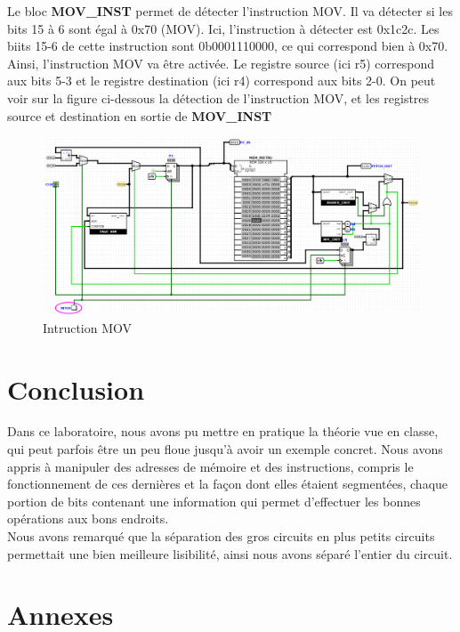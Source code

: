 \documentclass[a4paper]{article} %
\begin{document}
Le bloc \textbf{MOV\_INST} permet de détecter l'instruction MOV. Il va détecter si les bits 15 à 6 sont égal à 0x70 (MOV). Ici, l'instruction à détecter est 0x1c2c. Les biits 15-6 de cette instruction sont 0b0001110000, ce qui correspond bien à 0x70. Ainsi, l'instruction MOV va être activée. Le registre source (ici r5) correspond aux bits 5-3 et le registre destination (ici r4) correspond aux bits 2-0. On peut voir sur la figure ci-dessous la détection de l'instruction MOV, et les registres source et destination en sortie de \textbf{MOV\_INST}

\begin{figure}[H]
    \centering
    \includegraphics[width=1\textwidth]{src/FETCH_INTER_1c2c.png}
    \caption{Intruction MOV}
    \label{fetch_inter}
\end{figure}

\section{Conclusion}
Dans ce laboratoire, nous avons pu mettre en pratique la théorie vue en classe, qui peut parfois être un peu floue jusqu'à avoir un exemple concret. Nous avons appris à manipuler des adresses de mémoire et des instructions, compris le fonctionnement de ces dernières et la façon dont elles étaient segmentées, chaque portion de bits contenant une information qui permet d'effectuer les bonnes opérations aux bons endroits. \\
Nous avons remarqué que la séparation des gros circuits en plus petits circuits permettait une bien meilleure lisibilité, ainsi nous avons séparé l'entier du circuit.
\section{Annexes}
\end{document}
